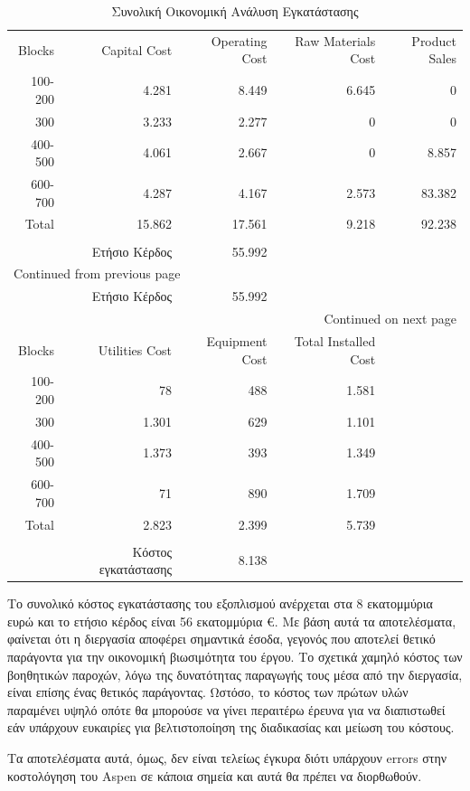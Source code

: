 \documentclass[11pt]{article}
\begin{document}
\begin{longtable}{rrrrr}
\caption{Συνολική Οικονομική Ανάλυση Εγκατάστασης}
\\
\hline
Blocks & Capital Cost & Operating Cost & Raw Materials Cost & Product Sales\\
100-200 & 4.281 & 8.449 & 6.645 & 0\\
300 & 3.233 & 2.277 & 0 & 0\\
400-500 & 4.061 & 2.667 & 0 & 8.857\\
600-700 & 4.287 & 4.167 & 2.573 & 83.382\\
Total & 15.862 & 17.561 & 9.218 & 92.238\\
 &  &  &  & \\
 & Ετήσιο Κέρδος & 55.992 &  & \\
\hline
\endfirsthead
\multicolumn{5}{l}{Continued from previous page} \\

 & Ετήσιο Κέρδος & 55.992 &  &  \\

\hline
\endhead
\hline\multicolumn{5}{r}{Continued on next page} \\
\endfoot
\endlastfoot
\hline
Blocks & Utilities Cost & Equipment Cost & Total Installed Cost & \\
100-200 & 78 & 488 & 1.581 & \\
300 & 1.301 & 629 & 1.101 & \\
400-500 & 1.373 & 393 & 1.349 & \\
600-700 & 71 & 890 & 1.709 & \\
Total & 2.823 & 2.399 & 5.739 & \\
 &  &  &  & \\
 & Kόστος εγκατάστασης & 8.138 &  & \\
\hline
\end{longtable}

Το συνολικό κόστος εγκατάστασης του εξοπλισμού ανέρχεται στα 8
εκατομμύρια ευρώ και το ετήσιο κέρδος είναι 56 εκατομμύρια €. Με βάση
αυτά τα αποτελέσματα, φαίνεται ότι η διεργασία αποφέρει σημαντικά έσοδα,
γεγονός που αποτελεί θετικό παράγοντα για την οικονομική βιωσιμότητα του
έργου. Το σχετικά χαμηλό κόστος των βοηθητικών παροχών, λόγω της
δυνατότητας παραγωγής τους μέσα από την διεργασία, είναι επίσης ένας θετικός
παράγοντας. Ωστόσο, το κόστος των πρώτων υλών παραμένει υψηλό οπότε θα
μπορούσε να γίνει περαιτέρω έρευνα για να διαπιστωθεί εάν υπάρχουν
ευκαιρίες για βελτιστοποίηση της διαδικασίας και μείωση του κόστους.

Τα αποτελέσματα αυτά, όμως, δεν είναι τελείως έγκυρα διότι υπάρχουν errors
στην κοστολόγηση του Aspen σε κάποια σημεία και αυτά θα πρέπει να διορθωθούν.
\end{document}

